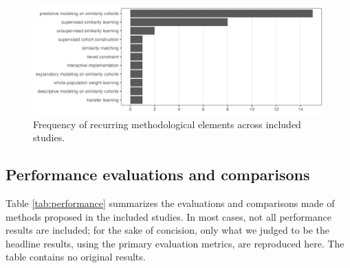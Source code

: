 \documentclass[sn-mathphys,Numbered,pdflatex]{sn-jnl}
\theoremstyle{remark}
\theoremstyle{definition}
\begin{document}
\normalsize

\begin{figure}

{\centering \includegraphics[width=1\linewidth]{Fig4} 

}

\caption{Frequency of recurring methodological elements across included studies.}\label{fig:methods}
\end{figure}

\subsection*{Performance evaluations and
comparisons}\label{performance-evaluations-and-comparisons}

Table \ref{tab:performance} summarizes the evaluations and comparisons
made of methods proposed in the included studies. In most cases, not all
performance results are included; for the sake of concision, only what
we judged to be the headline results, using the primary evaluation
metrics, are reproduced here. The table contains no original results.
\end{document}
